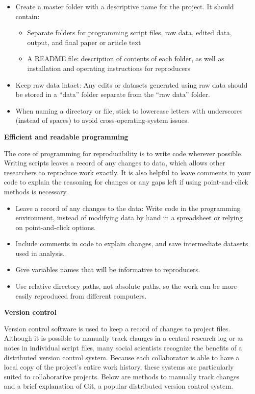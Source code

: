 \documentclass[]{book}
\providecommand{\tightlist}{%
  \setlength{\itemsep}{0pt}\setlength{\parskip}{0pt}}
\begin{document}
\begin{itemize}
\tightlist
\item
  Create a master folder with a descriptive name for the project. It should contain:

  \begin{itemize}
  \tightlist
  \item
    Separate folders for programming script files, raw data, edited data, output, and final paper or article text
  \item
    A README file: description of contents of each folder, as well as installation and operating instructions for reproducers
  \end{itemize}
\item
  Keep raw data intact: Any edits or datasets generated using raw data should be stored in a ``data'' folder separate from the ``raw data'' folder.
\item
  When naming a directory or file, stick to lowercase letters with underscores (instead of spaces) to avoid cross-operating-system issues.
\end{itemize}

\textbf{Efficient and readable programming}

The core of programming for reproducibility is to write code wherever possible. Writing scripts leaves a record of any changes to data, which allows other researchers to reproduce work exactly. It is also helpful to leave comments in your code to explain the reasoning for changes or any gaps left if using point-and-click methods is necessary.

\begin{itemize}
\tightlist
\item
  Leave a record of any changes to the data: Write code in the programming environment, instead of modifying data by hand in a spreadsheet or relying on point-and-click options.
\item
  Include comments in code to explain changes, and save intermediate datasets used in analysis.
\item
  Give variables names that will be informative to reproducers.
\item
  Use relative directory paths, not absolute paths, so the work can be more easily reproduced from different computers.
\end{itemize}

\textbf{Version control}

Version control software is used to keep a record of changes to project files. Although it is possible to manually track changes in a central research log or as notes in individual script files, many social scientists recognize the benefits of a distributed version control system. Because each collaborator is able to have a local copy of the project's entire work history, these systems are particularly suited to collaborative projects. Below are methods to manually track changes and a brief explanation of Git, a popular distributed version control system.
\end{document}
